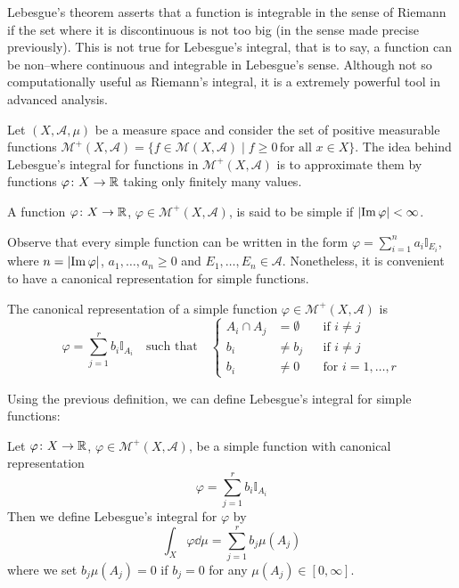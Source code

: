 Lebesgue's theorem asserts that a function is integrable in the sense of Riemann
if the set where it is discontinuous is not too big (in the sense made precise
previously). This is not true for Lebesgue's integral, that is to say, a
function can be non--where continuous and integrable in Lebesgue's sense.
Although not so computationally useful as Riemann's integral, it is a extremely
powerful tool in advanced analysis.

Let $(X, \mathcal{A}, \mu)$ be a measure space and consider the set of positive
measurable functions $\mathcal{M}^+(X, \mathcal{A}) = \{ f \in \mathcal{M}(X,
\mathcal{A}) \mid f \geq 0 \, \text{for all } x \in X \}$. The idea behind
Lebesgue's integral for functions in $\mathcal{M}^+(X, \mathcal{A})$ is to
approximate them by functions $\varphi \colon X \rightarrow \mathbb{R}$ taking only
finitely many values.

\begin{definition*}
	A function $\varphi \colon X \rightarrow \mathbb{R}$, $\varphi \in
	\mathcal{M}^+(X, \mathcal{A})$, is said to be simple if $\abs{\operatorname{Im}{\varphi}} < \infty$.
\end{definition*}

Observe that every simple function can be written in the form $\varphi =
\sum_{i=1}^n a_i \mathbb{I}_{E_i}$, where $n = \abs{\operatorname{Im}{\varphi}}$, $a_1, \ldots, a_n \geq 0$ and $E_1,
\ldots, E_n \in \mathcal{A}$. Nonetheless, it is convenient to have a canonical representation for simple functions.

\begin{definition*}
	The canonical representation of a simple function $\varphi \in \mathcal{M}^+(X, \mathcal{A})$ is
	\[
		\varphi = \sum_{j=1}^r b_i\mathbb{I}_{A_i} \quad \text{such that} \quad
		\left\{
			\begin{aligned}
				A_i \cap A_j &= \emptyset 	& &\text{if } i \neq j \\
				b_i &\neq b_j				& &\text{if } i \neq j \\
				b_i &\neq 0					& &\text{for } i = 1, \ldots, r
			\end{aligned}
		\right.
	\]
\end{definition*}

Using the previous definition, we can define Lebesgue's integral for simple functions:

\begin{definition*}
	Let $\varphi \colon X \rightarrow \mathbb{R}$, $\varphi \in \mathcal{M}^+(X,
	\mathcal{A})$, be a simple function with canonical representation
	\[
		\varphi = \sum_{j=1}^r b_i\mathbb{I}_{A_i}
	\]
	Then we define Lebesgue's integral for $\varphi$ by
	\[
		\int_X \varphi \dd{\mu} = \sum_{j=1}^r b_j \mu(A_j)	
	\]
	where we set $b_j \mu(A_j) = 0$ if $b_j = 0$ for any $\mu(A_j) \in [0, \infty]$.
\end{definition*}

